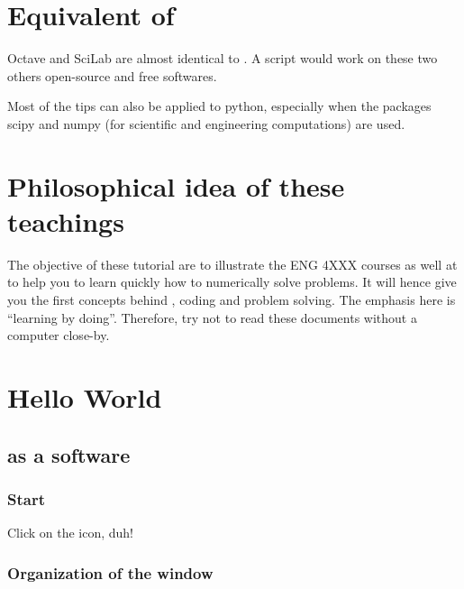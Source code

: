 \section{Equivalent of \matlab }

Octave and SciLab are almost identical to \matlab. A \matlab script would work on these two others open-source and free softwares.

Most of the tips can also be applied to python, especially when the packages scipy and numpy (for scientific and engineering computations) are used.


\section{Philosophical idea of these teachings}
The objective of these tutorial are to illustrate the ENG 4XXX courses as well at to help you to learn quickly how to numerically solve problems.
It will hence give you the first concepts behind \matlab, coding and problem solving.
The emphasis here is “learning by doing”. Therefore, try not to read these documents without a computer close-by.






\section{Hello World}

\subsection{\matlab as a software}
\subsubsection{Start \matlab}
Click on the icon, duh!
\subsubsection{Organization of the window}

